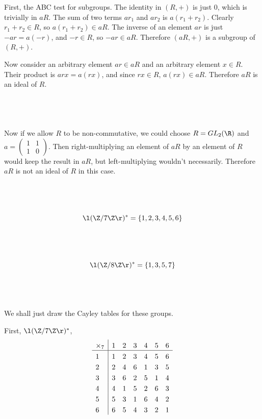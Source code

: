 \documentclass[a4paper]{article}
\begin{document}
First, the ABC test for subgroups. The identity in $(R, +)$ is just $0$, which is trivially in $aR$. The sum of two terms $ar_1$ and $ar_2$ is $a(r_1 + r_2)$. Clearly $r_1 + r_2 \in R$, so $a(r_1 + r_2) \in aR$. The inverse of an element $ar$ is just $-ar = a(-r)$, and $-r \in R$, so $-ar \in aR$. Therefore $(aR, +)$ is a subgroup of $(R, +)$.

Now consider an arbitrary element $ar \in aR$ and an arbitrary element $x \in R$. Their product is $arx = a(rx)$, and since $rx \in R$, $a(rx) \in aR$. Therefore $aR$ is an ideal of $R$.

\subsection{~}

Now if we allow $R$ to be non-commutative, we could choose $R = GL_2(\R)$ and $a = \begin{pmatrix}1 & 1\\ 1 & 0\end{pmatrix}$. Then right-multiplying an element of $aR$ by an element of $R$ would keep the result in $aR$, but left-multiplying wouldn't necessarily. Therefore $aR$ is not an ideal of $R$ in this case.


\subsection{~}

$$\l(\Z / 7\Z\r)^* = \{1, 2, 3, 4, 5, 6\}$$

\subsection{~}

$$\l(\Z / 8\Z\r)^* = \{1, 3, 5, 7\}$$

\subsection{~}

We shall just draw the Cayley tables for these groups.

First, $\l(\Z / 7\Z\r)^*$,
\[
\setlength{\extrarowheight}{3pt}%
\begin{array}{l|*{6}{l}}
	\times_7 & 1 & 2 & 3 & 4 & 5 & 6 \\
\hline
	1 & 1 & 2 & 3 & 4 & 5 & 6 \\
	2 & 2 & 4 & 6 & 1 & 3 & 5 \\
	3 & 3 & 6 & 2 & 5 & 1 & 4 \\
	4 & 4 & 1 & 5 & 2 & 6 & 3 \\
	5 & 5 & 3 & 1 & 6 & 4 & 2 \\
	6 & 6 & 5 & 4 & 3 & 2 & 1
\end{array}
\]
\end{document}
